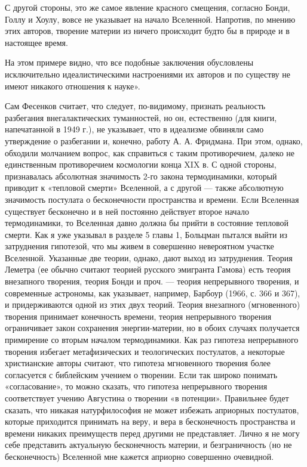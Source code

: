 С другой  стороны, это  же самое  явление красного  смещения, согласно
Бонди,  Голлу  и  Хоулу,  вовсе  не  указывает  на  начало  Вселенной.
Напротив,  по   мнению  этих  авторов,  творение   материи  из  ничего
происходит будто бы в природе и в настоящее время.

На  этом  примере  видно,  что  все  подобные  заключения  обусловлены
исключительно идеалистическими  настроениями их авторов и  по существу
не имеют никакого отношения к науке».

Сам Фесенков  считает, что  следует, по-видимому,  признать реальность
разбегания  внегалактических  туманностей,  но  он,  естественно  (для
книги, напечатанной в 1949 г.), не указывает, что в идеализме обвиняли
само утверждение о  разбегании и, конечно, работу А.  А. Фридмана. При
этом,  однако,  обходили  молчанием  вопрос, как  справиться  с  таким
противоречием, далеко  не единственным противоречием  космологии конца
XIX в. С одной стороны, признавалась абсолютная значимость 2-го закона
термодинамики,  который приводит  к «тепловой  смерти» Вселенной,  а с
другой  ---  также  абсолютную значимость  постулата  о  бесконечности
пространства и времени.  Если Вселенная существует бесконечно  и в ней
постоянно действует  второе начало  термодинамики, то  Вселенная давно
должна бы  прийти в состояние  тепловой смерти.  Как я уже  указывал в
разделе 5  главы 1, Больцман  пытался выйти из  затруднения гипотезой,
что  мы живем  в совершенно  невероятном участке  Вселенной. Указанные
две  теории,  однако,  дают   выход  из  затруднения.  Теория  Леметра
(ее  обычно считают  теорией  русского эмигранта  Гамова) есть  теория
внезапного  творения, теория  Бонди  и проч.  --- теория  непрерывного
творения, и  современные астрономы,  как указывает,  например, Барбоур
(1966,  с.   366  и  367),   и  придерживаются  одной  из   этих  двух
теорий. Теория внезапного  (мгновенного) творения принимает конечность
времени,  теория непрерывного  творения ограничивает  закон сохранения
энергии-материи, но  в обоих  случаях получается примирение  со вторым
началом   термодинамики.  Как   раз  гипотеза   непрерывного  творения
избегает  метафизических  и   теологических  постулатов,  а  некоторые
христианские авторы  считают, что гипотеза мгновенного  творения более
согласуется  с   библейским  учением  о  творении.   Если  так  широко
понимать «согласование»,  то можно сказать, что  гипотеза непрерывного
творения  соответствует  учению  Августина о  творении  «в  потенции».
Правильнее будет сказать, что никакая натурфилософия не может избежать
априорных  постулатов, которые  приходится принимать  на веру,  и вера
в  бесконечность  пространства  и времени  никаких  преимуществ  перед
другими не представляет.  Лично я не могу  себе представить актуальную
бесконечность   материи,  и   безграничность  (но   не  бесконечность)
Вселенной мне кажется априорно совершенно очевидной.

